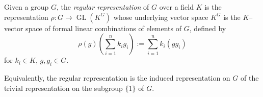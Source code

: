 \documentclass{article}
\newcommand{\GL}{\operatorname{GL}}
\begin{document}
Given a group $G$, the {\em regular representation} of $G$ over a field $K$ is the representation $\rho: G \longrightarrow \GL(K^G)$ whose underlying vector space $K^G$ is the $K$--vector space of formal linear combinations of elements of $G$, defined by
$$
\rho(g)\left(\sum_{i=1}^n k_i g_i\right) := \sum_{i=1}^n k_i (g g_i)
$$
for $k_i \in K$, $g, g_i \in G$.

Equivalently, the regular representation is the induced representation on $G$ of the trivial representation on the subgroup $\{1\}$ of $G$.
\end{document}
